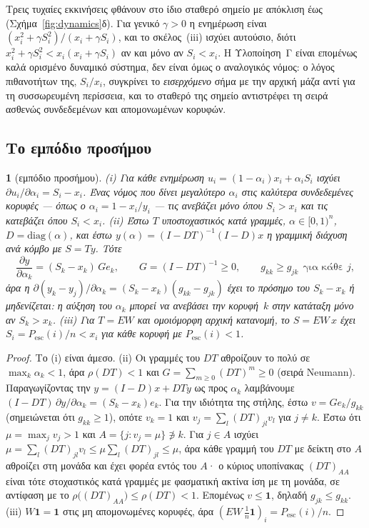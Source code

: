 \documentclass[11pt,a4paper]{article}
\theoremstyle{definition}
\theoremstyle{plain}
\newcommand{\genpropname}{}
\newtheorem*{genprop}{\genpropname}
\newenvironment{prop}[1]{\renewcommand{\genpropname}{Πρόταση #1}\begin{genprop}}{\end{genprop}}
\newcommand{\Pesc}{P_{\mathrm{esc}}}
\newcommand{\diag}{\mathrm{diag}}
\newcommand{\one}{\mathbf{1}}
\begin{document}
Τρεις τυχαίες εκκινήσεις φθάνουν στο ίδιο σταθερό σημείο με απόκλιση έως \CStartsDiff{} (Σχήμα~\ref{fig:dynamics}δ). Για γενικό $\gamma>0$ η ενημέρωση είναι $(x_i^2+\gamma S_i^2)/(x_i+\gamma S_i)$, και το σκέλος~(iii) ισχύει αυτούσιο, διότι $x_i^2+\gamma S_i^2<x_i(x_i+\gamma S_i)$ αν και μόνο αν $S_i<x_i$. Η Υλοποίηση~Γ είναι επομένως καλά ορισμένο δυναμικό σύστημα, δεν είναι όμως ο αναλογικός νόμος: ο λόγος πιθανοτήτων της, $S_i/x_i$, συγκρίνει το \emph{εισερχόμενο} σήμα με την αρχική μάζα αντί για τη συσσωρευμένη περίσσεια, και το σταθερό της σημείο αντιστρέφει τη σειρά ασθενώς συνδεδεμένων και απομονωμένων κορυφών.

\subsection{Το εμπόδιο προσήμου}

\begin{prop}{E}[εμπόδιο προσήμου]
(i) Για κάθε ενημέρωση $u_i=(1-\alpha_i)x_i+\alpha_iS_i$ ισχύει $\partial u_i/\partial\alpha_i=S_i-x_i$. Ένας νόμος που δίνει μεγαλύτερο $\alpha_i$ στις καλύτερα συνδεδεμένες κορυφές --- όπως ο $\alpha_i=1-x_i/y_i$ --- τις ανεβάζει μόνο όπου $S_i>x_i$ και τις κατεβάζει όπου $S_i<x_i$.
(ii) Έστω $T$ υποστοχαστικός κατά γραμμές, $\alpha\in[0,1)^n$, $D=\diag(\alpha)$, και έστω $y(\alpha)=(I-DT)^{-1}(I-D)x$ η γραμμική διάχυση ανά κόμβο με $S=Ty$. Τότε
\begin{equation}\label{eq:sign}
\frac{\partial y}{\partial\alpha_k}=(S_k-x_k)\,G e_k,\qquad G=(I-DT)^{-1}\ge0,\qquad g_{kk}\ge g_{jk}\ \ \text{για κάθε }j,
\end{equation}
άρα η $\partial(y_k-y_j)/\partial\alpha_k=(S_k-x_k)(g_{kk}-g_{jk})$ έχει το πρόσημο του $S_k-x_k$ ή μηδενίζεται: η αύξηση του $\alpha_k$ μπορεί να ανεβάσει την κορυφή~$k$ στην κατάταξη μόνο αν $S_k>x_k$.
(iii) Για $T=EW$ και ομοιόμορφη αρχική κατανομή, το $S=EW\,x$ έχει $S_i=\Pesc(i)/n<x_i$ για κάθε κορυφή με $\Pesc(i)<1$.
\end{prop}

\begin{proof}
Το (i) είναι άμεσο. (ii) Οι γραμμές του $DT$ αθροίζουν το πολύ σε $\max_k\alpha_k<1$, άρα $\rho(DT)<1$ και $G=\sum_{m\ge0}(DT)^m\ge0$ (σειρά Neumann). Παραγωγίζοντας την $y=(I-D)x+DTy$ ως προς $\alpha_k$ λαμβάνουμε $(I-DT)\,\partial y/\partial\alpha_k=(S_k-x_k)e_k$. Για την ιδιότητα της στήλης, έστω $v=Ge_k/g_{kk}$ (σημειώνεται ότι $g_{kk}\ge1$), οπότε $v_k=1$ και $v_j=\sum_l(DT)_{jl}v_l$ για $j\ne k$. Έστω ότι $\mu=\max_jv_j>1$ και $A=\{j:v_j=\mu\}\not\ni k$. Για $j\in A$ ισχύει $\mu=\sum_l(DT)_{jl}v_l\le\mu\sum_l(DT)_{jl}\le\mu$, άρα κάθε γραμμή του $DT$ με δείκτη στο $A$ αθροίζει στη μονάδα και έχει φορέα εντός του $A$· ο κύριος υποπίνακας $(DT)_{AA}$ είναι τότε στοχαστικός κατά γραμμές με φασματική ακτίνα ίση με τη μονάδα, σε αντίφαση με το $\rho\big((DT)_{AA}\big)\le\rho(DT)<1$. Επομένως $v\le\one$, δηλαδή $g_{jk}\le g_{kk}$. (iii) $W\one=\one$ στις μη απομονωμένες κορυφές, άρα $(EW\,\tfrac1n\one)_i=\Pesc(i)/n$.
\end{proof}
\end{document}

